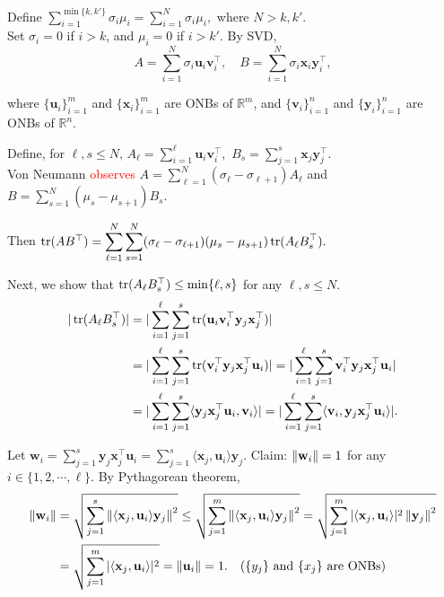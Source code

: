 \documentclass[12pt]{article}
\begin{document}
\begin{pfbox}
Define $\displaystyle\sum_{i=1}^{\min\{k,k'\}}\sigma_i\mu_i = \sum_{i=1}^{N}\sigma_i\mu_i,$ where $N>k,k'$.\\
Set $\sigma_i=0$ if $i>k$, and $\mu_i=0$ if $i>k'$.
By SVD,
\[
    A = \sum_{i=1}^{N}\sigma_i\mathbf{u}_i\mathbf{v}_i^\top,\quad
    B = \sum_{i=1}^{N}\sigma_i\mathbf{x}_i\mathbf{y}_i^\top,
\]

where $\{\mathbf{u}_i\}^m_{i=1}$ and $\{\mathbf{x}_i\}^m_{i=1}$ are ONBs of $\mathbb{R}^m$, and $\{\mathbf{v}_i\}^n_{i=1}$ and $\{\mathbf{y}_i\}^n_{i=1}$ are ONBs of $\mathbb{R}^n$.

Define, for $\ell,s\le N,\, A_\ell = \displaystyle\sum_{i=1}^{\ell}\mathbf{u}_i\mathbf{v}_i^\top,\,\, B_s = \displaystyle\sum_{j=1}^{s}\mathbf{x}_j\mathbf{y}_j^\top$.\\
Von Neumann \textcolor{red}{observes} $A=\displaystyle\sum_{\ell=1}^{N}(\sigma_\ell-\sigma_{\ell+1})A_\ell$ and $B = \displaystyle\sum_{s=1}^{N}(\mu_s-\mu_{s+1})B_s$. 

Then $\operatorname{tr}(AB^\top)=\displaystyle\sum_{\ell=1}^{N}\displaystyle\sum_{s=1}^{N}(\sigma_\ell-\sigma_{\ell+1})(\mu_s-\mu_{s+1})\operatorname{tr}(A_\ell B_s^\top).$

Next, we show that $\operatorname{tr}(A_\ell B_s^\top)\le\min\{\ell,s\}$ for any $\ell,s\le N.$
\begin{align*}
    |\operatorname{tr}(A_\ell B_s^\top)| &= |\sum_{i=1}^{\ell}\sum_{j=1}^{s}\operatorname{tr}(\mathbf{u}_i\mathbf{v}_i^\top\mathbf{y}_j\mathbf{x}_j^\top)|\\
    &= |\sum_{i=1}^{\ell}\sum_{j=1}^{s}\operatorname{tr}(\mathbf{v}_i^\top\mathbf{y}_j\mathbf{x}_j^\top \mathbf{u}_i)| = |\sum_{i=1}^{\ell}\sum_{j=1}^{s}\mathbf{v}_i^\top\mathbf{y}_j\mathbf{x}_j^\top \mathbf{u}_i|\\
    &= |\sum_{i=1}^{\ell}\sum_{j=1}^{s} \langle\mathbf{y}_j\mathbf{x}_j^\top \mathbf{u}_i, \mathbf{v}_i\rangle| =  |\sum_{i=1}^{\ell}\sum_{j=1}^{s} \langle \mathbf{v}_i, \mathbf{y}_j\mathbf{x}_j^\top \mathbf{u}_i\rangle|.
\end{align*}

Let $\mathbf{w}_i=\displaystyle\sum_{j=1}^{s}\mathbf{y}_j\mathbf{x}_j^\top \mathbf{u}_i=\displaystyle\sum_{j=1}^{s}\langle \mathbf{x}_j, \mathbf{u}_i\rangle \mathbf{y}_j.$
Claim: $\left\lVert \mathbf{w}_i \right\rVert = 1$ for any $i\in\{1,2,\cdots,\ell\}.$
By Pythagorean theorem,
\begin{align*}
\left\lVert \mathbf{w}_i \right\rVert&=\sqrt{\sum_{j=1}^{s}\left\lVert \langle \mathbf{x}_j, \mathbf{u}_i\rangle \mathbf{y}_j \right\rVert^2}
\le\sqrt{\sum_{j=1}^{m}\left\lVert \langle \mathbf{x}_j, \mathbf{u}_i\rangle \mathbf{y}_j \right\rVert^2}
=\sqrt{\sum_{j=1}^{m}|\langle \mathbf{x}_j, \mathbf{u}_i\rangle |^2\left\lVert \mathbf{y}_j \right\rVert^2}\\
&=\sqrt{\sum_{j=1}^{m}|\langle \mathbf{x}_j, \mathbf{u}_i\rangle |^2} 
=\left\lVert \mathbf{u}_i \right\rVert=1.  \quad \text{($\{y_j\}$ and $\{x_j\}$ are ONBs)}
\end{align*}


\end{pfbox}
\end{document}
